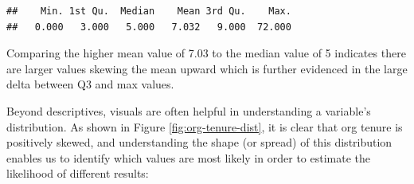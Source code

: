 \documentclass[
]{book}
\newenvironment{Shaded}{\begin{snugshade}}{\end{snugshade}}
\newcommand{\AttributeTok}[1]{\textcolor[rgb]{0.77,0.63,0.00}{#1}}
\newcommand{\CommentTok}[1]{\textcolor[rgb]{0.56,0.35,0.01}{\textit{#1}}}
\newcommand{\FloatTok}[1]{\textcolor[rgb]{0.00,0.00,0.81}{#1}}
\newcommand{\FunctionTok}[1]{\textcolor[rgb]{0.00,0.00,0.00}{#1}}
\newcommand{\NormalTok}[1]{#1}
\newcommand{\SpecialCharTok}[1]{\textcolor[rgb]{0.00,0.00,0.00}{#1}}
\newcommand{\StringTok}[1]{\textcolor[rgb]{0.31,0.60,0.02}{#1}}
\begin{document}
\begin{Shaded}
\end{Shaded}

\begin{verbatim}
##    Min. 1st Qu.  Median    Mean 3rd Qu.    Max. 
##   0.000   3.000   5.000   7.032   9.000  72.000
\end{verbatim}

Comparing the higher mean value of 7.03 to the median value of 5 indicates there are larger values skewing the mean upward which is further evidenced in the large delta between Q3 and max values.

Beyond descriptives, visuals are often helpful in understanding a variable's distribution. As shown in Figure \ref{fig:org-tenure-dist}, it is clear that org tenure is positively skewed, and understanding the shape (or spread) of this distribution enables us to identify which values are most likely in order to estimate the likelihood of different results:

\begin{Shaded}
\end{Shaded}
\end{document}
